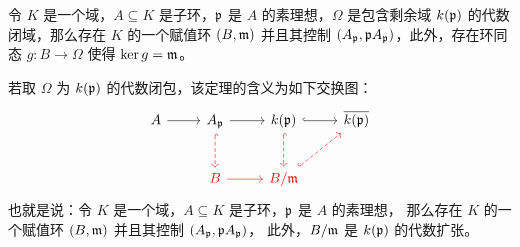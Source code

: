 \begin{theorem}\label{thm:existence of valuation ring}
  令 $K$ 是一个域，$A\subseteq K$ 是子环，$\mathfrak{p}$ 是 $A$ 的素理想，$\Omega$
  是包含剩余域 $k(\mathfrak{p})$ 的代数闭域，那么存在 $K$ 的一个赋值环 $(B,\mathfrak{m})$
  并且其控制 $(A_{\mathfrak{p}},\mathfrak{p}A_{\mathfrak{p}})$，此外，存在环同态 $g:B\to\Omega$
  使得 $\ker g=\mathfrak{m}$。
\end{theorem}
\begin{remark}
  若取 $\Omega$ 为 $k(\mathfrak{p})$ 的代数闭包，该定理的含义为如下交换图：
  \[
    \begin{tikzcd}[row sep=2.4em]
      A\arrow[r] & A_{\ideal p}\arrow[r]\arrow[d,dashed,hookrightarrow,red] 
      & k(\ideal p)\arrow[r,hookrightarrow] \arrow[d,dashed,hookrightarrow,red] 
      & \overline{k(\ideal p)} \\
      & |[red]|B\arrow[r,red] & |[red]|B/\ideal m\arrow[ur,dashed,hookrightarrow,red]  & 
    \end{tikzcd}  
  \]
  也就是说：令 $K$ 是一个域，$A\subseteq K$ 是子环，$\mathfrak{p}$ 是 $A$ 的素理想，
  那么存在 $K$ 的一个赋值环 $(B,\mathfrak{m})$ 并且其控制 $(A_{\mathfrak{p}},\mathfrak{p}A_{\mathfrak{p}})$，
  此外，$B/\mathfrak{m}$ 是 $k(\mathfrak{p})$ 的代数扩张。
\end{remark}
